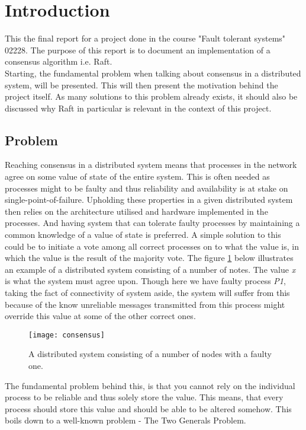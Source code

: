 \section{Introduction}
This the final report for a project done in the course "Fault tolerant systems" 02228. The purpose of this report is to document an implementation of a consensus algorithm i.e. Raft. \\
Starting, the fundamental problem when talking about consensus in a distributed system, will be presented. This will then present the motivation behind the project itself. As many solutions to this problem already exists, it should also be discussed why Raft in particular is relevant in the context of this project.

\subsection{Problem}
Reaching consensus in a distributed system means that processes in the network agree on some value of state of the entire system. This is often needed as processes might to be faulty and thus reliability and availability is at stake on single-point-of-failure. Upholding these properties in a given distributed system then relies on the architecture utilised and hardware implemented in the processes. And having system that can tolerate faulty processes by maintaining a common knowledge of a value of state is preferred. A simple solution to this could be to initiate a vote among all correct processes on to what the value is, in which the value is the result of the majority vote. The figure \ref{consensus} below illustrates an example of a distributed system consisting of a number of notes. The value \textit{x} is what the system must agree upon. Though here we have faulty process \textit{P1}, taking the fact of connectivity of system aside, the system will suffer from this because of the know unreliable messages transmitted from this process might override this value at some of the other correct ones. \\
\begin{figure}[h]
	\centering
	\texttt{[image: consensus]}
	\caption{A distributed system consisting of a number of nodes with a faulty one.}
	\label{consensus}
\end{figure}
The fundamental problem behind this, is that you cannot rely on the individual process to be reliable and thus solely store the value. This means, that every process should store this value and should be able to be altered somehow. This boils down to a well-known problem - The Two Generals Problem. 
